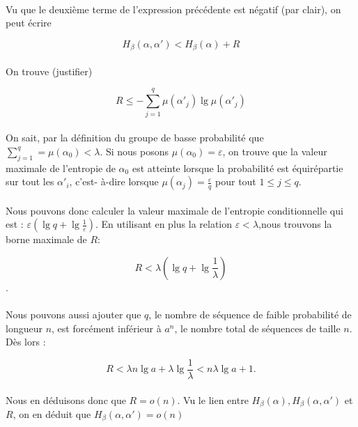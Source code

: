 	\paragraph{}
	Vu que le deuxième terme de l'expression précédente est négatif (par clair), on peut écrire
	
	\[H_\beta(\alpha,\alpha') < H_\beta(\alpha) + R\]
	
	\paragraph{}
	On trouve (justifier)
	
	\[R \le -\sum_{j=1}^q\mu(\alpha'_j)\lg\mu(\alpha'_j)\]
	
	\paragraph{}
	On sait, par la définition du groupe de basse probabilité que $\sum_{j=1}^q =\mu(\alpha_0) < \lambda$. Si nous posons $\mu(\alpha_0)=\varepsilon$,
	on trouve que la valeur maximale de l'entropie de $\alpha_0$ est atteinte lorsque la probabilité est équirépartie sur tout les $\alpha'_i$, c'est-
	à-dire lorsque $\mu(\alpha_j)=\frac{\varepsilon}{q}$ pour tout $1\le j\le q$.
	
	\paragraph{}
	Nous pouvons donc calculer la valeur maximale de l'entropie conditionnelle qui est : $\varepsilon \left(\lg q+\lg\frac{1}{\varepsilon}\right)$.
	En utilisant en plus la relation $\varepsilon < \lambda$,nous trouvons la borne maximale de $R$:
	
	\[R<\lambda\left(\lg q+\lg\frac{1}{\lambda}\right)\].
	
	\paragraph{}
	Nous pouvons aussi ajouter que $q$, le nombre de séquence de faible probabilité de longueur $n$, est forcément inférieur à $a^n$, le nombre total de séquences de taille $n$.
	Dès lors :
	
	\[R<\lambda n\lg a +\lambda \lg \frac{1}{\lambda}<n\lambda\lg a+1.\]
	
	\paragraph{}
	Nous en déduisons donc que $R=o(n)$. Vu le lien entre $H_\beta(\alpha),H_\beta(\alpha,\alpha')$ et $R$, on en déduit que $H_\beta(\alpha,\alpha')=o(n)$
	
